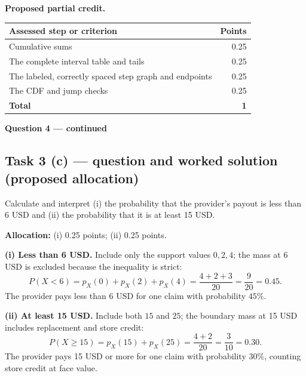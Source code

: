 \par\smallskip
\noindent\begin{minipage}{\linewidth}
\textbf{Proposed partial credit.}\par\smallskip
\begin{tabularx}{\linewidth}{@{}>{\raggedright\arraybackslash}X r@{}}\toprule
\textbf{Assessed step or criterion} & \textbf{Points}\\\midrule
Cumulative sums & 0.25\\
The complete interval table and tails & 0.25\\
The labeled, correctly spaced step graph and endpoints & 0.25\\
The CDF and jump checks & 0.25\\
\midrule
\textbf{Total} & \textbf{1}\\
\bottomrule\end{tabularx}
\end{minipage}\par\smallskip

\par\vspace{3mm}\secInicio[][sec:q4]

\clearpage
\textbf{Question 4 --- continued}

\subsection*{Task 3 (c) --- question and worked solution (proposed allocation) }
\label{sol:q4t3}

Calculate and interpret (i) the probability that the provider's payout is less than 6 USD and (ii) the probability that it is at least 15 USD.

\textbf{Allocation:} (i) 0.25 points; (ii) 0.25 points.

\textbf{(i) Less than 6 USD.} Include only the support values $0,2,4$; the mass at 6 USD is excluded because the inequality is strict:
\[
P(X<6)=p_X(0)+p_X(2)+p_X(4)
=\frac{4+2+3}{20}=\frac9{20}=0.45.
\]
The provider pays less than 6 USD for one claim with probability $45\%$.

\textbf{(ii) At least 15 USD.} Include both $15$ and $25$; the boundary mass at 15 USD includes replacement and store credit:
\[
P(X\geq15)=p_X(15)+p_X(25)=\frac{4+2}{20}=\frac3{10}=0.30.
\]
The provider pays 15 USD or more for one claim with probability $30\%$, counting store credit at face value.

